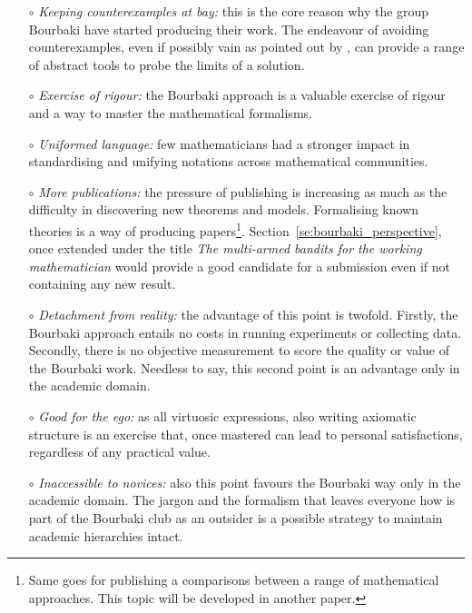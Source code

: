 \documentclass[]{scrartcl}
\theoremstyle{definition}
\begin{document}
\begin{itemize}

    \item[$\circ$] \emph{Keeping counterexamples at bay:} this is the core reason why the group Bourbaki have started producing their work. The endeavour of avoiding counterexamples, even if possibly vain as pointed out by \cite{mathias1992ignorance}, can provide a range of abstract tools to probe the limits of a solution.
     
    \item[$\circ$] \emph{Exercise of rigour:} the Bourbaki approach is a valuable exercise of rigour and a way to master the mathematical formalisms. 
    
    \item[$\circ$] \emph{Uniformed language:} few mathematicians had a stronger impact in standardising and unifying notations across mathematical communities.

    \item[$\circ$] \emph{More publications:} the pressure of publishing is increasing as much as the difficulty in discovering new theorems and models. Formalising known theories is a way of producing papers\footnote{
        Same goes for publishing a comparisons between a range of mathematical approaches. This topic will be developed in another paper.
    }. Section~\ref{se:bourbaki_perspective}, once extended under the title \emph{The multi-armed bandits for the working mathematician} would provide a good candidate for a submission even if not containing any new result.
    
    \item[$\circ$] \emph{Detachment from reality:} the advantage of this point is twofold. Firstly, the Bourbaki approach entails no costs in running experiments or collecting data. Secondly, there is no objective measurement to score the quality or value of the Bourbaki work. Needless to say, this second point is an advantage only in the academic domain.
    
    \item[$\circ$] \emph{Good for the ego:} as all virtuosic expressions, also writing axiomatic structure is an exercise that, once mastered can lead to personal satisfactions, regardless of any practical value.
    
    \item[$\circ$] \emph{Inaccessible to novices:} also this point favours the Bourbaki way only in the academic domain. The jargon and the formalism that leaves everyone how is part of the Bourbaki club as an outsider is a possible strategy to maintain academic hierarchies intact.
    

\end{itemize}
\end{document}
